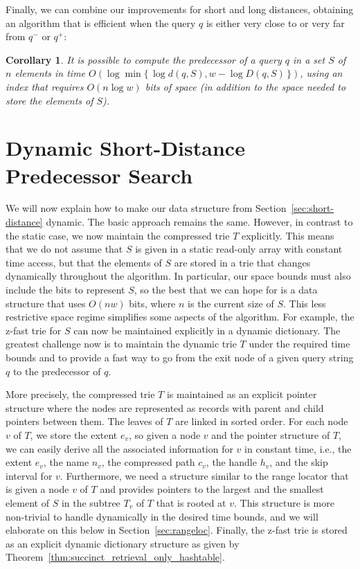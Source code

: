 \documentclass[a4paper,11pt]{article}
\newtheorem{corollary}[theorem]{Corollary}
\newcommand{\?}{\mskip1.5mu}
\begin{document}
Finally, we can combine our improvements for short and long 
distances, obtaining an algorithm that is
efficient when the query $q$ is either very close to or very far 
from $q^-$ or $q^+$:

\begin{corollary}
It is possible to compute the predecessor of a query $q$ in a set $S$
of $n$ elements in time $O(\log \min \{\,\log d(q, S), w - \log D(q,S)\,\})$, 
using an index that
requires $O(n \log w)$ bits of space (in addition to the space
needed to store the elements of $S$).
\end{corollary}

\section{Dynamic Short-Distance Predecessor Search}
\label{sec:dyn_pred}

We will now explain how to make our data
structure
from Section~\ref{sec:short-distance} dynamic.
The basic approach remains the same.
However, in contrast to the static case, we now 
maintain the compressed trie $T$ explicitly. 
This means that we do not assume that $S$
is given in a static read-only array with constant
time access, but that the elements of $S$
are stored in a trie that changes dynamically throughout
the algorithm. In particular, our space bounds must also 
include the bits to represent $S$, so the best 
that we can hope for is a data structure that uses $O(nw)$
bits, where $n$ is the current size of $S$. This less restrictive
space regime simplifies some aspects of the algorithm. For example,
the z-fast trie for $S$ can now be maintained explicitly in a
dynamic dictionary. The greatest challenge now is to maintain
the dynamic trie $T$ under the required time bounds and to provide
a fast way to go from the exit node of a given query string $q$ to the 
predecessor of $q$.

More precisely, the compressed trie $T$ is maintained as
an explicit pointer structure where the nodes are represented
as records with parent and
child pointers between them. The leaves of $T$ are
linked in sorted order. For each node
$v$ of $T$, we store the extent $e_v$,
so given a node $v$ and the pointer structure
of $T$, we can easily derive all the associated
information for $v$ in constant time, i.e., the extent $e_v$, 
the name $n_v$, the compressed path $c_v$, the handle $h_v$, and the skip 
interval for $v$.
Furthermore, we need a structure similar to the range locator 
that is given a node $v$ of $T$ and provides pointers to
the largest and the smallest element of $S$ in the subtree
$T_v$ of $T$ that is rooted at $v$. This structure is more non-trivial
to handle dynamically in the desired time bounds, and we will elaborate
on this below in Section~\ref{sec:rangeloc}. 
Finally, the z-fast trie is stored as an explicit
dynamic dictionary structure as given by 
Theorem~\ref{thm:succinct_retrieval_only_hashtable}.
\end{document}
